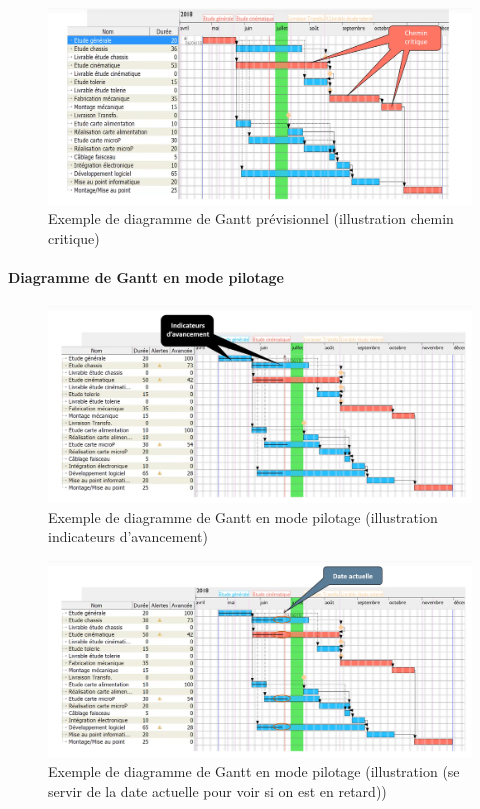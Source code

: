 \begin{figure}[!h]
	\begin{center}
		\includegraphics[scale=0.2]{images/exemple_diagramme_gantt2.png}
		\caption{Exemple de diagramme de Gantt prévisionnel (illustration chemin critique)}
	\end{center}
\end{figure}
\paragraph*{Diagramme de Gantt en mode pilotage}
\begin{figure}[!h]
	\begin{center}
		\includegraphics[scale=0.2]{images/diagramme_gantt_pilotage1.png}
		\caption{Exemple de diagramme de Gantt en mode pilotage (illustration indicateurs d'avancement)}
	\end{center}
\end{figure}
\begin{figure}[!h]
	\begin{center}
		\includegraphics[scale=0.2]{images/diagramme_gantt_pilotage.png}
		\caption{Exemple de diagramme de Gantt en mode pilotage (illustration (se servir de la date actuelle pour voir si on est en retard))}
	\end{center}
\end{figure}